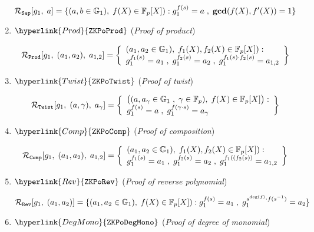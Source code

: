 \documentclass[11pt, lettersize, notitlepage, leqno, footskip=0.6cm]{article}
\newcommand{\bFp}{\mathbb{F}_p}
\newcommand{\mc}{\mathcal}
\newcommand{\mb}{\mathbb}
\newcommand{\mbf}{\mathbf}
\newcommand{\vs}{\vspace{-0.15cm}}
\newcommand{\GCD}{\mbf{gcd}}
\numberwithin{equation}{section}
\begin{document}
\begin{enumerate}[wide, labelwidth=!, labelindent=0pt, itemsep=-0.2ex]
$$\mc{R}_{\tt{Sep}}[g_1,\;a] = \{(a,b\in\mb{G}_1),\; f(X)\in \bFp[X]): g_1^{f(s)} = a\;,\;\GCD(f(X), f'(X)) = 1 \} $$


\item $\hyperlink{Prod}{\tt{ZKPoProd}}$ (\textit{Proof of product}) \vspace{-0.5cm}

$$\mc{R}_{\tt{Prod}}[g_1,\;(a_1,a_2),\;a_{1,2}] = \left\{\begin{array}{l}(a_1,a_2\in\mb{G}_1),\; f_1(X),f_2(X)\in \bFp[X]):\\ g_1^{f_1(s)} = a_1\;,\; g_1^{f_2(s)} = a_2\;,\; g_1^{f_1(s)\cdot f_2(s)} = a_{1,2} \end{array}\right\} \vs $$

\item $\hyperlink{Twist}{\tt{ZKPoTwist}}$ (\textit{Proof of twist}) \vspace{-0.5cm}


\vs $$\mc{R}_{\tt{Twist}}[g_1,\;(a,\gamma),\;a_{\gamma}] = \left\{\begin{array}{l} 
\big((a,a_{\gamma}\in\mb{G}_1\;,\; \gamma\in\bFp ),\; f(X)\in \bFp[X]\big):\\
g_1^{f(s)} = a\;,\; g_1^{f(\gamma\cdot s)} = a_{\gamma}\end{array}\right\} \vs $$


\item $\hyperlink{Comp}{\tt{ZKPoComp}}$ (\textit{Proof of composition}) \vspace{-3mm}

$$\mc{R}_{\tt{Comp}}[g_1,\;(a_1,a_2),\;a_{1,2}] = \left\{\begin{array}{l} 
(a_1,a_2\in\mb{G}_1),\; f_1(X),f_2(X)\in \bFp[X]):\\ g_1^{f_1(s)} = a_1\;,\; g_1^{f_2(s)} = a_2\;,\; g_1^{f_1((f_2(s))} = a_{1,2} \end{array}\right\} \vs $$




\item $\hyperlink{Rev}{\tt{ZKPoRev}}$ (\textit{Proof of reverse polynomial}) \vspace{-3mm}

$$\mc{R}_{\tt{Rev}}[g_1,\;(a_1,a_2)] = \{(a_1,a_2\in\mb{G}_1),\; f(X)\in \bFp[X]): g_1^{f(s)} = a_1\;,\; g_1^{s^{\deg(f)}\cdot f(s^{-1})} = a_2\} $$



\item $\hyperlink{DegMono}{\tt{ZKPoDegMono}}$ (\textit{Proof of degree of monomial}) \vspace{-3mm}


\end{enumerate}
\end{document}
